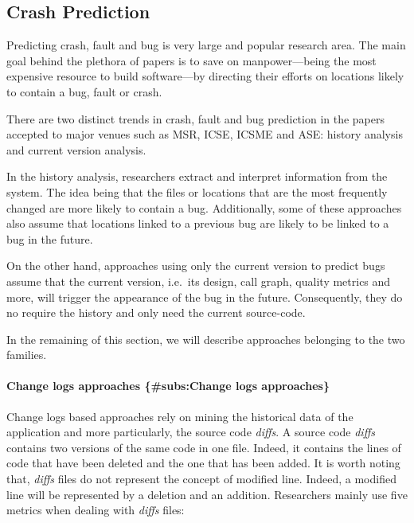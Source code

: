 \subsection{Crash Prediction}\label{crash-prediction}

Predicting crash, fault and bug is very large and popular research area.
The main goal behind the plethora of papers is to save on
manpower---being the most expensive resource to build software---by
directing their efforts on locations likely to contain a bug, fault or
crash.

There are two distinct trends in crash, fault and bug prediction in the
papers accepted to major venues such as MSR, ICSE, ICSME and ASE:
history analysis and current version analysis.

In the history analysis, researchers extract and interpret information
from the system. The idea being that the files or locations that are the
most frequently changed are more likely to contain a bug. Additionally,
some of these approaches also assume that locations linked to a previous
bug are likely to be linked to a bug in the future.

On the other hand, approaches using only the current version to predict
bugs assume that the current version, i.e.~its design, call graph,
quality metrics and more, will trigger the appearance of the bug in the
future. Consequently, they do no require the history and only need the
current source-code.

In the remaining of this section, we will describe approaches belonging
to the two families.

\paragraph{Change logs approaches \{\#subs:Change logs
approaches\}}\label{change-logs-approaches-subschange-logs-approaches}

Change logs based approaches rely on mining the historical data of the
application and more particularly, the source code \emph{diffs}. A
source code \emph{diffs} contains two versions of the same code in one
file. Indeed, it contains the lines of code that have been deleted and
the one that has been added. It is worth noting that, \emph{diffs} files
do not represent the concept of modified line. Indeed, a modified line
will be represented by a deletion and an addition. Researchers mainly
use five metrics when dealing with \emph{diffs} files:


